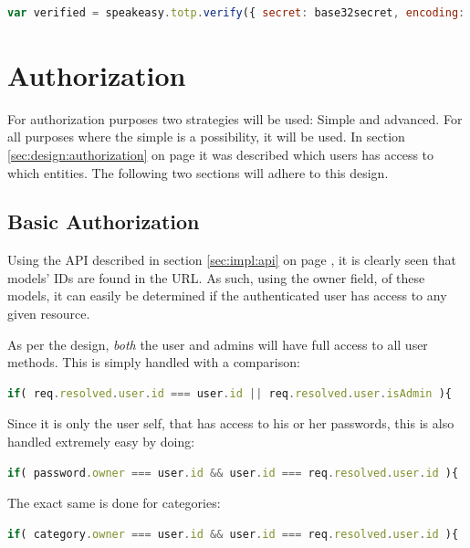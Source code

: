 			\begin{lstlisting}[gobble=16,language=JavaScript,caption={Verifying a TOTP token using Speakeasy},label={lst:example:speakeasy:verification}]
                var verified = speakeasy.totp.verify({ secret: base32secret, encoding: 'base32', token: userToken });
			\end{lstlisting}

	\section{Authorization}
		\label{sec:impl:authorization}
		For authorization purposes two strategies will be used: Simple and advanced. For all purposes where the simple is a possibility, it will be used. In section \ref{sec:design:authorization} on page \pageref{sec:design:authorization} it was described which users has access to which entities. The following two sections will adhere to this design.

		\subsection{Basic Authorization}
			Using the API described in section \ref{sec:impl:api} on page \pageref{sec:impl:api}, it is clearly seen that models' IDs are found in the URL. As such, using the owner field, of these models, it can easily be determined if the authenticated user has access to any given resource.

			As per the design, \emph{both} the user and admins will have full access to all user methods. This is simply handled with a comparison:
			\begin{lstlisting}[gobble=16,language=JavaScript]
                if( req.resolved.user.id === user.id || req.resolved.user.isAdmin ){
			\end{lstlisting}

			Since it is only the user self, that has access to his or her passwords, this is also handled extremely easy by doing:
			\begin{lstlisting}[gobble=16,language=JavaScript]
                if( password.owner === user.id && user.id === req.resolved.user.id ){
			\end{lstlisting}
			The exact same is done for categories:
			\begin{lstlisting}[gobble=16,language=JavaScript]
                if( category.owner === user.id && user.id === req.resolved.user.id ){
			\end{lstlisting}

